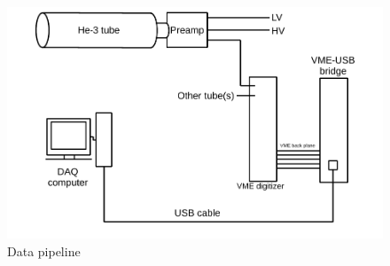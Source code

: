 \begin{figure}[htb]
	\centerfloat
	\includegraphics[width=6in]{images/DAQ-Pipeline}
	\caption{Data pipeline}	
	\label{fig:dataFlow}
\end{figure}

